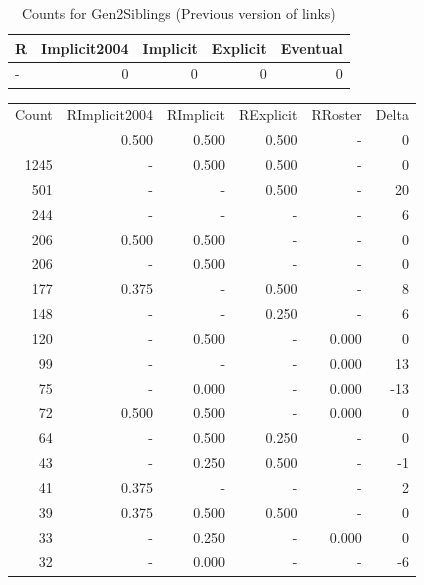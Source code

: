 \documentclass[a4paper]{article}\usepackage[]{graphicx}\usepackage[]{color}
\begin{document}
\begin{table}[ht]
\centering
{\large
\begin{tabular}{lrrrr}
  \hline
R & Implicit2004 & Implicit & Explicit & Eventual \\ 
  \hline
- &   0 &   0 &   0 &   0 \\ 
   \hline
\end{tabular}
}
\caption{Counts for Gen2Siblings (Previous version of links)} 
\end{table}



\begin{table}[ht]
\centering
\begin{tabular}{rrrrrr}
  \hline
Count & RImplicit2004 & RImplicit & RExplicit & RRoster & Delta \\ 
  \rowcolor{goodColor}  \hline
1446 & 0.500 & 0.500 & 0.500 & - & 0 \\ 
   \rowcolor{goodColor} 1245 & - & 0.500 & 0.500 & - & 0 \\ 
   \rowcolor{sosoColor} 501 & - & - & 0.500 & - & 20 \\ 
   \rowcolor{nullColor} 244 & - & - & - & - & 6 \\ 
  206 & 0.500 & 0.500 & - & - & 0 \\ 
  206 & - & 0.500 & - & - & 0 \\ 
   \rowcolor{sosoColor} 177 & 0.375 & - & 0.500 & - & 8 \\ 
   \rowcolor{sosoColor} 148 & - & - & 0.250 & - & 6 \\ 
  120 & - & 0.500 & - & 0.000 & 0 \\ 
   \rowcolor{nullColor} 99 & - & - & - & 0.000 & 13 \\ 
  75 & - & 0.000 & - & 0.000 & -13 \\ 
  72 & 0.500 & 0.500 & - & 0.000 & 0 \\ 
   \rowcolor{badColor} 64 & - & 0.500 & 0.250 & - & 0 \\ 
   \rowcolor{badColor} 43 & - & 0.250 & 0.500 & - & -1 \\ 
   \rowcolor{nullColor} 41 & 0.375 & - & - & - & 2 \\ 
   \rowcolor{goodColor} 39 & 0.375 & 0.500 & 0.500 & - & 0 \\ 
  33 & - & 0.250 & - & 0.000 & 0 \\ 
  32 & - & 0.000 & - & - & -6 \\ 

\end{tabular}
\end{table}
\end{document}
